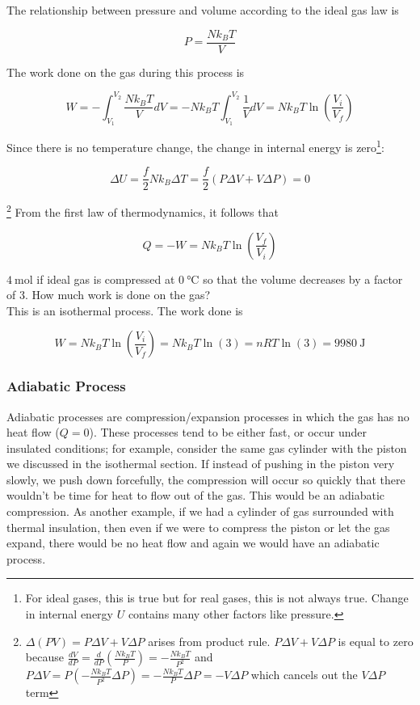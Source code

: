 \documentclass[12pt, a4paper]{article}
\newcounter{exa}
\begin{document}
The relationship between pressure and volume according to the ideal gas law is

$$P=\frac{Nk_BT}{V}$$

The work done on the gas during this process is

$$W=-\int_{V_1}^{V_2} \frac{Nk_BT}{V} dV = -Nk_BT \int_{V_1}^{V_2}\frac{1}{V}dV = Nk_BT\ln\left( \frac{V_i}{V_f} \right)$$

Since there is no temperature change, the change in internal energy is zero\footnote{For ideal gases, this is true but for real gases, this is not always true. Change in internal energy $U$ contains many other factors like pressure.}:

$$\Delta U = \frac{f}{2}Nk_B\Delta T = \frac{f}{2} (P \Delta V + V\Delta P) = 0$$

\footnote{$\Delta(PV)=P \Delta V + V\Delta P$ arises from product rule. $P \Delta V + V\Delta P$ is equal to zero because $\frac{dV}{dP}=\frac{d}{dP}\left( \frac{Nk_BT}{P} \right)=-\frac{Nk_BT}{P^2}$ and $P\Delta V=P\left(-\frac{Nk_BT}{P^2}\Delta P\right)=-\frac{Nk_BT}{P}\Delta P=-V\Delta P$ which cancels out the $V\Delta P$ term} From the first law of thermodynamics, it follows that

$$Q=-W=Nk_BT\ln\left( \frac{V_f}{V_i} \right)$$

\begin{texample}
$\SI{4}{\mole}$ if ideal gas is compressed at $\SI{0}{\celsius}$ so that the volume decreases by a factor of $3$. How much work is done on the gas? \\

This is an isothermal process. The work done is

$$W=Nk_BT\ln\left( \frac{V_i}{V_f} \right)=Nk_BT\ln\left( 3 \right)=nRT\ln(3)=\SI{9980}{\joule}$$
\end{texample}

\subsubsection{Adiabatic Process}

Adiabatic processes are compression/expansion processes in which the gas has no heat flow ($Q=0$). These processes tend to be either fast, or occur under insulated conditions; for example, consider the same gas cylinder with the piston we discussed in the isothermal section. If instead of pushing in the piston very slowly, we push down forcefully, the compression will occur so quickly that there wouldn't be time for heat to flow out of the gas. This would be an adiabatic compression. As another example, if we had a cylinder of gas surrounded with thermal insulation, then even if we were to compress the piston or let the gas expand, there would be no heat flow and again we would have an adiabatic process. \\
\end{document}
